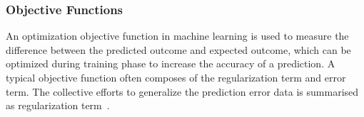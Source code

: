 \subsubsection{Objective Functions}
An optimization objective function in machine learning is used to measure the difference between the predicted outcome and expected outcome, which can be optimized during training phase to increase the accuracy of a prediction. A typical objective function often composes of the regularization term and error term. The collective efforts to generalize the prediction error data is summarised as regularization term~\cite{goodfellow_2015}.  